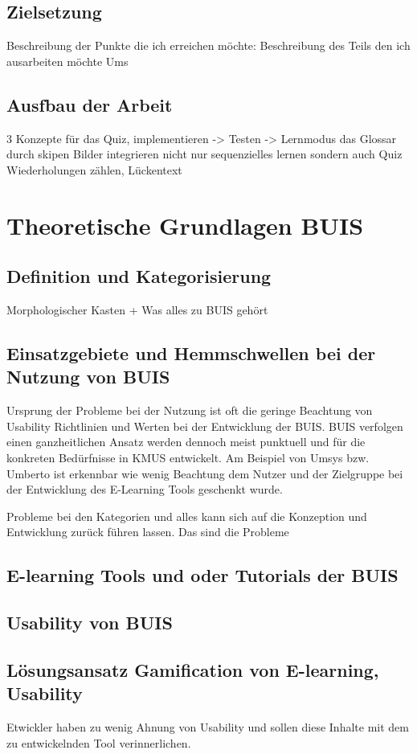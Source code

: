 \documentclass[a4paper, 12pt, twoside, BCOR=20mm, DIV=calc, abstracton, parskip=half*, toc=bibliography, toc=listof, headsepline, headings=small, numbers=enddot]{scrreprt} %
\begin{document}
\section{Zielsetzung}
Beschreibung der Punkte die ich erreichen möchte:
Beschreibung des Teils den ich ausarbeiten möchte
Ums

\section{Ausfbau der Arbeit}
3 Konzepte für das Quiz, implementieren -> Testen ->
Lernmodus das Glossar durch skipen Bilder integrieren 
nicht nur sequenzielles lernen sondern auch  
Quiz  Wiederholungen zählen, 
Lückentext 


\chapter{Theoretische Grundlagen BUIS}
\section{Definition und Kategorisierung}
Morphologischer Kasten + Was alles zu BUIS gehört
\section{Einsatzgebiete und Hemmschwellen bei der Nutzung von BUIS}
Ursprung der Probleme bei der Nutzung ist oft die geringe Beachtung von Usability Richtlinien und Werten bei der Entwicklung der BUIS. 
BUIS verfolgen einen ganzheitlichen Ansatz werden dennoch meist punktuell und für die konkreten Bedürfnisse in KMUS entwickelt. 
Am Beispiel von Umsys bzw. Umberto ist erkennbar wie wenig Beachtung dem Nutzer und der Zielgruppe bei der Entwicklung des E-Learning Tools geschenkt wurde. 

Probleme bei den Kategorien und alles kann sich auf die Konzeption und Entwicklung zurück führen lassen.
Das sind die Probleme
\section{E-learning Tools und oder Tutorials der BUIS}
\section{Usability von BUIS}

\section{Lösungsansatz Gamification von E-learning, Usability}
Etwickler haben zu wenig Ahnung von Usability und sollen diese Inhalte mit dem zu entwickelnden Tool verinnerlichen. 
\end{document}
